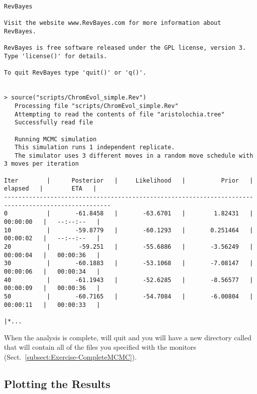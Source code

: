 {\tiny{\tt \begin{snugshade*}
\begin{lstlisting}
RevBayes

Visit the website www.RevBayes.com for more information about RevBayes.

RevBayes is free software released under the GPL license, version 3. Type 'license()' for details.

To quit RevBayes type 'quit()' or 'q()'.


> source("scripts/ChromEvol_simple.Rev")
   Processing file "scripts/ChromEvol_simple.Rev"
   Attempting to read the contents of file "aristolochia.tree"
   Successfully read file

   Running MCMC simulation
   This simulation runs 1 independent replicate.
   The simulator uses 3 different moves in a random move schedule with 3 moves per iteration

Iter        |      Posterior   |     Likelihood   |          Prior   |    elapsed   |        ETA   |
----------------------------------------------------------------------------------------------------
0           |       -61.8458   |       -63.6701   |        1.82431   |   00:00:00   |   --:--:--   |
10          |       -59.8779   |       -60.1293   |       0.251464   |   00:00:02   |   --:--:--   |
20          |        -59.251   |       -55.6886   |       -3.56249   |   00:00:04   |   00:00:36   |
30          |       -60.1883   |       -53.1068   |       -7.08147   |   00:00:06   |   00:00:34   |
40          |       -61.1943   |       -52.6285   |       -8.56577   |   00:00:09   |   00:00:36   |
50          |       -60.7165   |       -54.7084   |       -6.00804   |   00:00:11   |   00:00:33   |

|*...
\end{lstlisting}
\end{snugshade*}}}

When the analysis is complete, \RevBayes will quit and you will have a new directory called  that will contain all of the files you specified with the monitors (Sect.\ \ref{subsect:Exercise-CompleteMCMC}).

\subsection{Plotting the Results}

